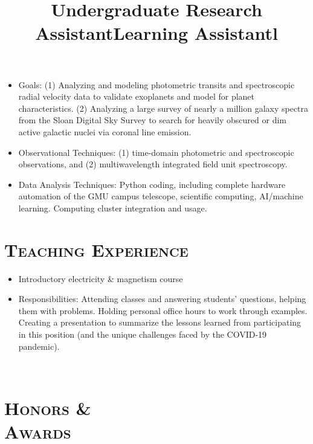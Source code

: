 \documentclass[marg, centered]{res}
\newcommand{\CVItem}[1]{
  \item\small{
    {#1 \vspace{-2pt}}
  }
}
\begin{document}
\begin{resume}
\title{\textbf{Undergraduate Research Assistant}}
\begin{position}
\vspace{-0.35cm}
\begin{itemize}
    \CVItem{Goals: (1) Analyzing and modeling photometric transits and spectroscopic radial velocity data to validate exoplanets and model for planet characteristics. (2) Analyzing a large survey of nearly a million galaxy spectra from the Sloan Digital Sky Survey to search for heavily obscured or dim active galactic nuclei via coronal line emission.}
    \CVItem{Observational Techniques: (1) time-domain photometric and spectroscopic observations, and (2) multiwavelength integrated field unit spectroscopy.} 
    \CVItem{Data Analysis Techniques: Python coding, including complete hardware automation of the GMU campus telescope, scientific computing, AI/machine learning. Computing cluster integration and usage.}
\end{itemize}
\end{position}

\section{{\scshape \bfseries Teaching Experience}}
\title{\textbf{Learning Assistant}}
\begin{position}
\vspace{-0.35cm}
\begin{itemize}
    \CVItem{Introductory electricity \& magnetism course}
    \CVItem{Responsibilities: Attending classes and answering students’ questions, helping them with problems. Holding personal office hours to work through examples. Creating a presentation to summarize the lessons learned from participating in this position (and the unique challenges faced by the COVID-19 pandemic).}
\end{itemize}
\end{position}

\begin{format}
\title{l} \\
\body
\end{format}


\section{{\scshape \bfseries Honors \&\\ Awards}}


\end{resume}
\end{document}
